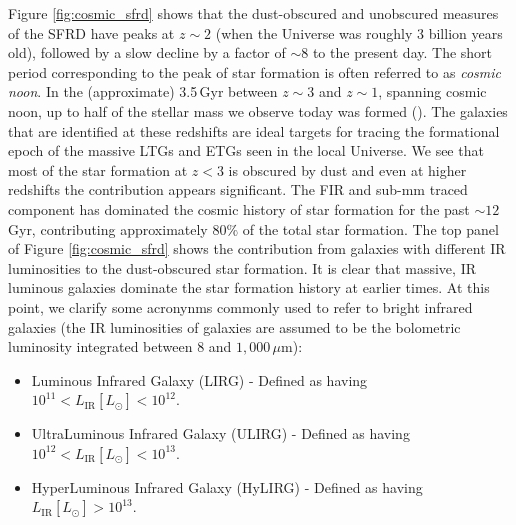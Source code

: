 Figure \ref{fig:cosmic_sfrd} shows that the dust-obscured and unobscured measures of the SFRD have peaks at $z\sim2$ (when the Universe was roughly 3 billion years old), followed by a slow decline by a factor of $\sim 8$ to the present day. The short period corresponding to the peak of star formation is often referred to as \textit{cosmic noon}. In the (approximate) 3.5\,Gyr between $z\sim3$ and $z\sim1$, spanning cosmic noon, up to half of the stellar mass we observe today was formed (\citealt{Forster-Schreiber_2020}). The galaxies that are identified at these redshifts are ideal targets for tracing the formational epoch of the massive LTGs and ETGs seen in the local Universe. We see that most of the star formation at $z < 3$ is obscured by dust and even at higher redshifts the contribution appears significant. The FIR and sub-mm traced component has dominated the cosmic history of star formation for the past $\sim 12\,$Gyr, contributing approximately $80\%$ of the total star formation. The top panel of Figure \ref{fig:cosmic_sfrd} shows the contribution from galaxies with different IR luminosities to the dust-obscured star formation. It is clear that massive, IR luminous galaxies dominate the star formation history at earlier times. At this point, we clarify some acronynms commonly used to refer to bright infrared galaxies (the IR luminosities of galaxies are assumed to be the bolometric luminosity integrated between $8$ and $1,000\,\mu$m):

\begin{itemize}
    \item Luminous Infrared Galaxy (LIRG) - Defined as having $10^{11} < L_\textrm{IR} [L_\odot] < 10^{12}$.
    \item UltraLuminous Infrared Galaxy (ULIRG) - Defined as having $10^{12} < L_\textrm{IR} [L_\odot] < 10^{13}$.
    \item HyperLuminous Infrared Galaxy (HyLIRG) - Defined as having $L_\textrm{IR} [L_\odot] > 10^{13}$.
\end{itemize}

